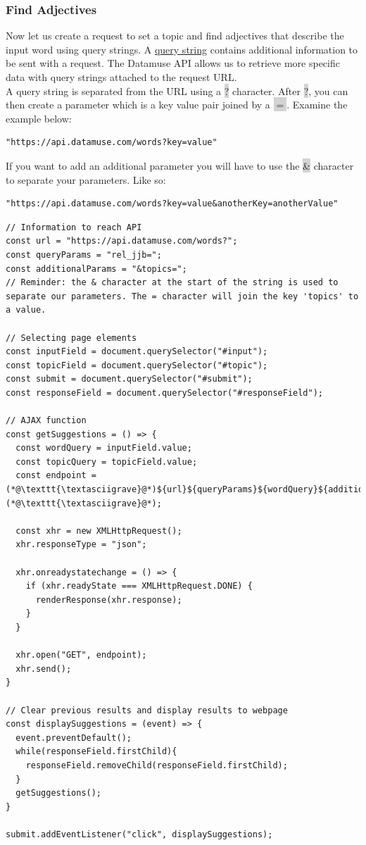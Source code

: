 \documentclass[11pt]{article}
\begin{document}
\subsubsection{Find Adjectives}
Now let us create a request to set a topic and find adjectives that describe the input word using query strings. A \href{https://en.wikipedia.org/wiki/Query_string}{query string} contains additional information to be sent with a request. The Datamuse API allows us to retrieve more specific data with query strings attached to the request URL. \\
\newline
A query string is separated from the URL using a \colorbox{lightgray}{?} character. After \colorbox{lightgray}{?}, you can then create a parameter which is a key value pair joined by a \colorbox{lightgray}{$=$}. Examine the example below:
\begin{lstlisting}[basicstyle=\small\ttfamily\color{theWhite}, backgroundcolor = \color{theBlack}, language = Comment]
"https://api.datamuse.com/words?key=value"
\end{lstlisting}
If you want to add an additional parameter you will have to use the \colorbox{lightgray}{\&} character to separate your parameters. Like so:
\begin{lstlisting}[basicstyle=\small\ttfamily\color{theWhite}, backgroundcolor = \color{theBlack}, language = Comment]
"https://api.datamuse.com/words?key=value&anotherKey=anotherValue"
\end{lstlisting}
\begin{lstlisting}
// Information to reach API
const url = "https://api.datamuse.com/words?";
const queryParams = "rel_jjb=";
const additionalParams = "&topics=";
// Reminder: the & character at the start of the string is used to separate our parameters. The = character will join the key 'topics' to a value.

// Selecting page elements
const inputField = document.querySelector("#input");
const topicField = document.querySelector("#topic");
const submit = document.querySelector("#submit");
const responseField = document.querySelector("#responseField");

// AJAX function
const getSuggestions = () => {
  const wordQuery = inputField.value;
  const topicQuery = topicField.value; 
  const endpoint = (*@\texttt{\textasciigrave}@*)${url}${queryParams}${wordQuery}${additionalParams}${topicQuery}(*@\texttt{\textasciigrave}@*);
  
  const xhr = new XMLHttpRequest();
  xhr.responseType = "json";

  xhr.onreadystatechange = () => {
    if (xhr.readyState === XMLHttpRequest.DONE) {
      renderResponse(xhr.response);
    }
  }
  
  xhr.open("GET", endpoint);
  xhr.send();
}

// Clear previous results and display results to webpage
const displaySuggestions = (event) => {
  event.preventDefault();
  while(responseField.firstChild){
    responseField.removeChild(responseField.firstChild);
  }
  getSuggestions();
}

submit.addEventListener("click", displaySuggestions);
\end{lstlisting}
\end{document}
